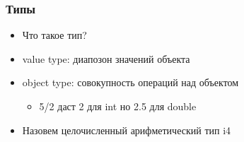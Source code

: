 \documentclass[russian, 12pt]{beamer}
\begin{document}
\begin{frame}
\frametitle{Типы}

\begin{itemize}
  \item Что такое тип?\\[0.3cm]
  \item value type: диапозон значений объекта\\[0.3cm]
  \item object type: совокупность операций над объектом\\[0.15cm]
  \begin{itemize}
    \item 5/2 даст 2 для int но 2.5 для double\\[0.2cm]
  \end{itemize}

  \item Назовем целочисленный арифметический тип i4
\end{itemize}

\end{frame}
\end{document}
